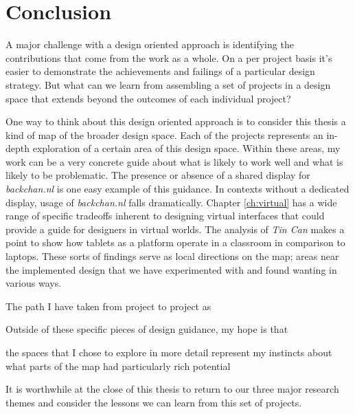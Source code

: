 \chapter{Conclusion}

A major challenge with a design oriented approach is identifying the contributions that come from the work as a whole. On a per project basis it's easier to demonstrate the achievements and failings of a particular design strategy. But what can we learn from assembling a set of projects in a design space that extends beyond the outcomes of each individual project?

One way to think about this design oriented approach is to consider this thesis a kind of map of the broader design space. Each of the projects represents an in-depth exploration of a certain area of this design space. Within these areas, my work can be a very concrete guide about what is likely to work well and what is likely to be problematic. The presence or absence of a shared display for \emph{backchan.nl} is one easy example of this guidance. In contexts without a dedicated display, usage of \emph{backchan.nl} falls dramatically. Chapter \ref{ch:virtual} has a wide range of specific tradeoffs inherent to designing virtual interfaces that could provide a guide for designers in virtual worlds. The analysis of \emph{Tin Can} makes a point to show how tablets as a platform operate in a classroom in comparison to laptops. These sorts of findings serve as local directions on the map; areas near the implemented design that we have experimented with and found wanting in various ways. 

The path I have taken from project to project as

Outside of these specific pieces of design guidance, my hope is that 


the spaces that I chose to explore in more detail represent my instincts about what parts of the map had particularly rich potential 



It is worthwhile at the close of this thesis to return to our three major research themes and consider the lessons we can learn from this set of projects.

